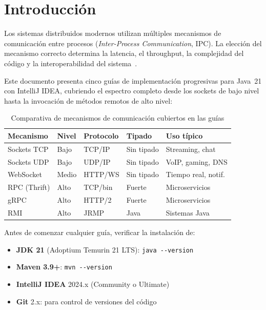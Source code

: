 \documentclass[12pt, a4paper, openany]{book}
\newcommand{\code}[1]{\texttt{\small#1}}
\begin{document}
	\tableofcontents
	\listoffigures
	\newpage
	
	\chapter*{Introducción}
	
	Los sistemas distribuidos modernos utilizan múltiples mecanismos de comunicación
	entre procesos (\emph{Inter-Process Communication}, IPC). La elección del mecanismo
	correcto determina la latencia, el throughput, la complejidad del código y la
	interoperabilidad del sistema~\parencite{vanSteen2023}.
	
	Este documento presenta cinco guías de implementación progresivas para Java~21 con
	IntelliJ IDEA, cubriendo el espectro completo desde los sockets de bajo nivel hasta
	la invocación de métodos remotos de alto nivel:
	
	\begin{table}[H]
		\centering
		\caption{Comparativa de mecanismos de comunicación cubiertos en las guías}
		\label{tab:comparativa}
		\begin{tabularx}{\linewidth}{@{}lXXXX@{}}
			\toprule
			\textbf{Mecanismo} & \textbf{Nivel} & \textbf{Protocolo} & \textbf{Tipado} & \textbf{Uso típico} \\
			\midrule
			Sockets TCP  & Bajo   & TCP/IP   & Sin tipado & Streaming, chat \\
			Sockets UDP  & Bajo   & UDP/IP   & Sin tipado & VoIP, gaming, DNS \\
			WebSocket    & Medio  & HTTP/WS  & Sin tipado & Tiempo real, notif. \\
			RPC (Thrift) & Alto   & TCP/bin  & Fuerte     & Microservicios \\
			gRPC         & Alto   & HTTP/2   & Fuerte     & Microservicios \\
			RMI          & Alto   & JRMP     & Java       & Sistemas Java \\
			\bottomrule
		\end{tabularx}
	\end{table}
	
	\begin{prerequisitobox}
		Antes de comenzar cualquier guía, verificar la instalación de:
		\begin{itemize}
			\item \textbf{JDK 21} (Adoptium Temurin 21 LTS): \code{java -\/\/-version}
			\item \textbf{Maven 3.9+}: \code{mvn -\/\/-version}
			\item \textbf{IntelliJ IDEA} 2024.x (Community o Ultimate)
			\item \textbf{Git} 2.x: para control de versiones del código
		\end{itemize}
	\end{prerequisitobox}
	
\end{document}
